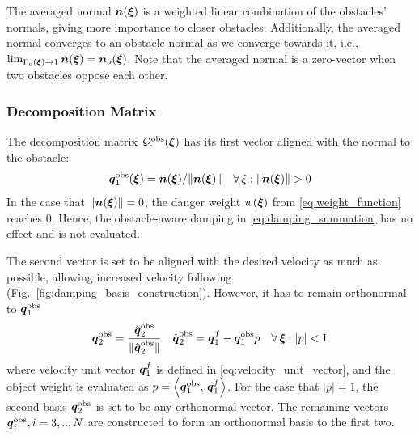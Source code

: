 The averaged normal $\boldsymbol{n}(\boldsymbol{\xi})$ is a weighted linear combination of the obstacles' normals, giving more importance to closer obstacles.
Additionally, the averaged normal converges to an obstacle normal as we converge towards it, i.e., $\lim_{\Gamma_o(\boldsymbol{\xi}) \rightarrow 1} \boldsymbol{n}(\boldsymbol{\xi}) = \boldsymbol{n}_o(\boldsymbol{\xi})$.
Note that the averaged normal is a zero-vector when two obstacles oppose each other. 

\subsubsection{Decomposition Matrix}
The decomposition matrix $\mathcal{Q}^{\mathrm{obs}}(\boldsymbol{\xi})$ has its first vector aligned with the normal to the obstacle:  
\begin{equation}
    \boldsymbol{q}_1^{\mathrm{obs}}(\boldsymbol{\xi}) =  \boldsymbol{n}(\boldsymbol{\xi}) / \lVert\boldsymbol{n}(\boldsymbol{\xi})\rVert 
    \quad \forall \, \xi : \lVert\boldsymbol{n}(\boldsymbol{\xi})\rVert  > 0
\end{equation}
In the case that $\lVert\boldsymbol{n}(\boldsymbol{\xi})\rVert = 0$, the danger weight $w(\boldsymbol{\xi})$ from \eqref{eq:weight_function} reaches 0. Hence, the obstacle-aware damping in \eqref{eq:damping_summation} has no effect and is not evaluated.

The second vector is set to be aligned with the desired velocity as much as possible, allowing increased velocity following (Fig.~\ref{fig:damping_basis_construction}). However, it has to remain orthonormal to $\boldsymbol{q}_1^{\mathrm{obs}}$
\begin{equation}
  \boldsymbol{q}_2^{\mathrm{obs}} = \frac{\hat{\boldsymbol{q}}_2^{\mathrm{obs}}}{\| \hat{\boldsymbol{q}}_2^{\mathrm{obs}} \|}
  \quad
  \hat{\boldsymbol{q}}_2^{\mathrm{obs}} = \boldsymbol{q}_1^{f} - \boldsymbol{q}_1^{\mathrm{obs}} p \quad  \forall \, \boldsymbol{\xi} : | p | < 1
\end{equation}
where velocity unit vector $\boldsymbol{q}_1^{f}$ is defined in \eqref{eq:velocity_unit_vector}, and the object weight is evaluated as $p = \left\langle {\boldsymbol{q}_1^{\mathrm{obs}}}, \, {\boldsymbol{q}_1^{f}} \right\rangle$. 
For the case that $| p | = 1$, the second basis $\boldsymbol{q}_2^{\mathrm{obs}}$ is set to be any orthonormal vector. The remaining vectors $\boldsymbol{q}_i^{\mathrm{obs}}, i = 3, .., N$ are constructed to form an orthonormal basis to the first two.

